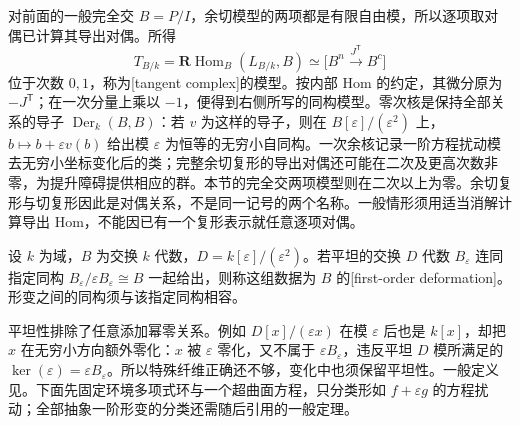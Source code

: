 \ProseParagraphBreak
对前面的一般完全交 \(B=P/I\)，余切模型的两项都是有限自由模，所以逐项取对偶已计算其导出对偶。所得
\[
	T_{B/k}=\mathbf R\operatorname{Hom}_B(L_{B/k},B) \simeq\bigl[B^n\xrightarrow{J^{\mathsf T}}B^c\bigr]
\]
位于次数 \(0,1\)，称为[tangent complex]的模型。按内部 Hom 的约定，其微分原为 \(-J^{\mathsf T}\)；在一次分量上乘以 \(-1\)，便得到右侧所写的同构模型。零次核是保持全部关系的导子 \(\operatorname{Der}_k(B,B)\)：若 \(v\) 为这样的导子，则在 \(B[\varepsilon]/(\varepsilon^2)\) 上，\(b\mapsto b+\varepsilon v(b)\) 给出模 \(\varepsilon\) 为恒等的无穷小自同构。一次余核记录一阶方程扰动模去无穷小坐标变化后的类；完整余切复形的导出对偶还可能在二次及更高次数非零，为提升障碍提供相应的群。本节的完全交两项模型则在二次以上为零。余切复形与切复形因此是对偶关系，不是同一记号的两个名称。一般情形须用适当消解计算导出 Hom，不能因已有一个复形表示就任意逐项对偶。

\begin{definition}\label{b3:def:first-order-deformation}
	设 \(k\) 为域，\(B\) 为交换 \(k\) 代数，\(D=k[\varepsilon]/(\varepsilon^2)\)。若平坦的交换 \(D\) 代数 \(B_\varepsilon\) 连同指定同构 \(B_\varepsilon/\varepsilon B_\varepsilon\cong B\) 一起给出，则称这组数据为 \(B\) 的[first-order deformation]。形变之间的同构须与该指定同构相容。
\end{definition}

平坦性排除了任意添加幂零关系。例如 \(D[x]/(\varepsilon x)\) 在模 \(\varepsilon\) 后也是 \(k[x]\)，却把 \(x\) 在无穷小方向额外零化：\(x\) 被 \(\varepsilon\) 零化，又不属于 \(\varepsilon B_\varepsilon\)，违反平坦 \(D\) 模所满足的 \(\ker(\varepsilon)=\varepsilon B_\varepsilon\)。所以特殊纤维正确还不够，变化中也须保留平坦性。一般定义见\cite[Section 4.3, Definition 4.3.2]{LichtenbaumSchlessinger1967CotangentComplex}。下面先固定环境多项式环与一个超曲面方程，只分类形如 \(f+\varepsilon g\) 的方程扰动；全部抽象一阶形变的分类还需随后引用的一般定理。

